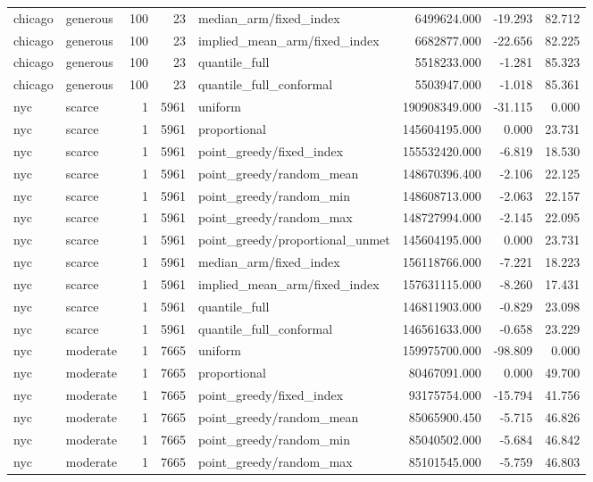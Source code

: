 \begin{tabular}{llrrlrrr}
chicago & generous & 100 & 23 & median\_arm/fixed\_index & 6499624.000 & -19.293 & 82.712 \\
chicago & generous & 100 & 23 & implied\_mean\_arm/fixed\_index & 6682877.000 & -22.656 & 82.225 \\
chicago & generous & 100 & 23 & quantile\_full & 5518233.000 & -1.281 & 85.323 \\
chicago & generous & 100 & 23 & quantile\_full\_conformal & 5503947.000 & -1.018 & 85.361 \\
nyc & scarce & 1 & 5961 & uniform & 190908349.000 & -31.115 & 0.000 \\
nyc & scarce & 1 & 5961 & proportional & 145604195.000 & 0.000 & 23.731 \\
nyc & scarce & 1 & 5961 & point\_greedy/fixed\_index & 155532420.000 & -6.819 & 18.530 \\
nyc & scarce & 1 & 5961 & point\_greedy/random\_mean & 148670396.400 & -2.106 & 22.125 \\
nyc & scarce & 1 & 5961 & point\_greedy/random\_min & 148608713.000 & -2.063 & 22.157 \\
nyc & scarce & 1 & 5961 & point\_greedy/random\_max & 148727994.000 & -2.145 & 22.095 \\
nyc & scarce & 1 & 5961 & point\_greedy/proportional\_unmet & 145604195.000 & 0.000 & 23.731 \\
nyc & scarce & 1 & 5961 & median\_arm/fixed\_index & 156118766.000 & -7.221 & 18.223 \\
nyc & scarce & 1 & 5961 & implied\_mean\_arm/fixed\_index & 157631115.000 & -8.260 & 17.431 \\
nyc & scarce & 1 & 5961 & quantile\_full & 146811903.000 & -0.829 & 23.098 \\
nyc & scarce & 1 & 5961 & quantile\_full\_conformal & 146561633.000 & -0.658 & 23.229 \\
nyc & moderate & 1 & 7665 & uniform & 159975700.000 & -98.809 & 0.000 \\
nyc & moderate & 1 & 7665 & proportional & 80467091.000 & 0.000 & 49.700 \\
nyc & moderate & 1 & 7665 & point\_greedy/fixed\_index & 93175754.000 & -15.794 & 41.756 \\
nyc & moderate & 1 & 7665 & point\_greedy/random\_mean & 85065900.450 & -5.715 & 46.826 \\
nyc & moderate & 1 & 7665 & point\_greedy/random\_min & 85040502.000 & -5.684 & 46.842 \\
nyc & moderate & 1 & 7665 & point\_greedy/random\_max & 85101545.000 & -5.759 & 46.803 \\

\end{tabular}

